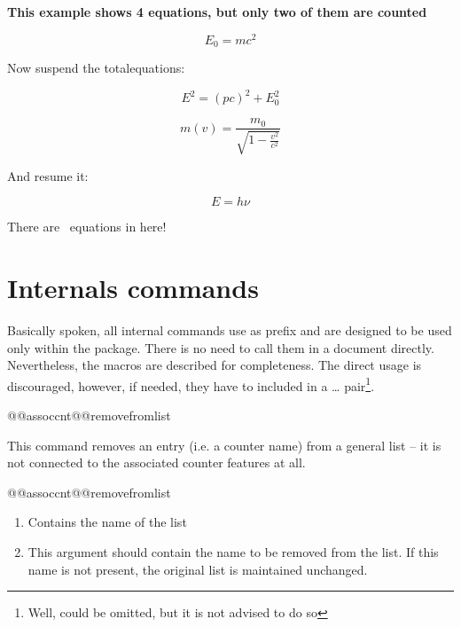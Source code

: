 \documentclass[12pt,paper=a4]{ltxdoc}
\begin{document}
\begin{dispExample}
\textbf{This example shows 4 equations, but only two of them are counted}

\begin{equation}
E_{0} = mc^2
\end{equation}

Now suspend the totalequations:

\begin{equation}
E^2 = \left({ pc}\right)^2 + E^{2}_{0}
\end{equation}

\begin{equation}
  m(v) = \frac{m_{0}}{\sqrt{1-\frac{v^2}{c^2}}} 
\end{equation}

And resume it: \ResumeSuspendedCounters

\begin{equation}
  E = h \nu
\end{equation}

There are \number{}~equations in here!
\end{dispExample}




\section{Internals commands}

Basically spoken, all internal commands use  as prefix and are designed to be used only within the package. There is no need to call them in a document directly. Nevertheless, the macros are described for completeness. The direct usage is discouraged, however, if needed, they have to included in a  \ldots {} pair\footnote{Well,  could be omitted, but it is not advised to do so}.

\begin{docCommand}{@@assoccnt@@removefromlist}{}

This command removes an entry (i.e. a counter name) from a general list -- it is not connected to the associated counter features at all. 
\begin{docCommandArgs}{@@assoccnt@@removefromlist}%
\begin{enumerate}[label={\textcolor{blue}{\#\arabic*}}]
\item {}%

  Contains the name of the list

\item {}

  This argument should contain the name to be removed from the list. If this name is not present, the original list is maintained unchanged. 

\end{enumerate}
\end{docCommandArgs}

\end{docCommand}%
\end{document}
